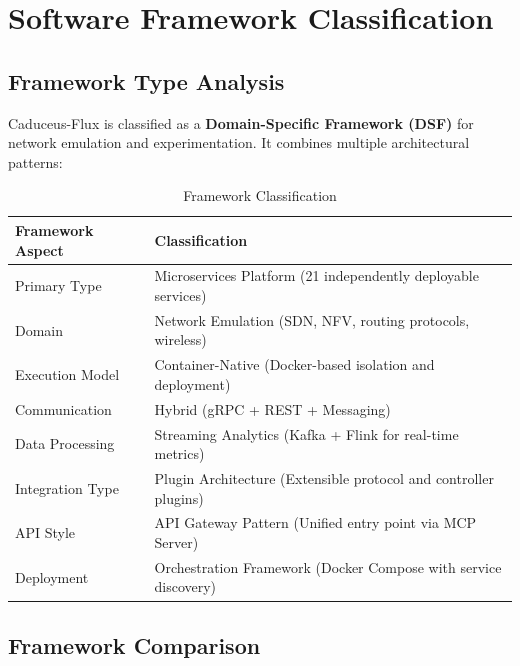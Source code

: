 \documentclass[10pt,a4paper]{article}
\begin{document}
\section{Software Framework Classification}

\subsection{Framework Type Analysis}

Caduceus-Flux is classified as a \textbf{Domain-Specific Framework (DSF)} for network emulation and experimentation. It combines multiple architectural patterns:

\begin{table}[htbp]
\centering
\caption{Framework Classification}
\begin{tabularx}{\textwidth}{lX}
\toprule
\textbf{Framework Aspect} & \textbf{Classification} \\
\midrule
Primary Type & Microservices Platform (21 independently deployable services) \\
Domain & Network Emulation (SDN, NFV, routing protocols, wireless) \\
Execution Model & Container-Native (Docker-based isolation and deployment) \\
Communication & Hybrid (gRPC + REST + Messaging) \\
Data Processing & Streaming Analytics (Kafka + Flink for real-time metrics) \\
Integration Type & Plugin Architecture (Extensible protocol and controller plugins) \\
API Style & API Gateway Pattern (Unified entry point via MCP Server) \\
Deployment & Orchestration Framework (Docker Compose with service discovery) \\
\bottomrule
\end{tabularx}
\end{table}

\subsection{Framework Comparison}
\end{document}
